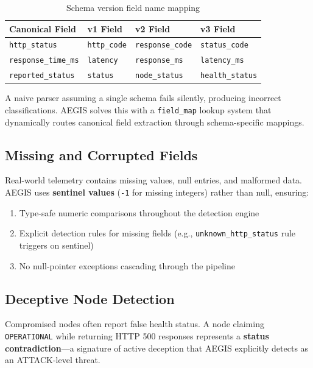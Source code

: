 \documentclass[12pt,a4paper]{article}
\begin{document}
\begin{table}[H]
\centering
\begin{tabularx}{\linewidth}{l l l l}
\toprule
\textbf{Canonical Field} & \textbf{v1 Field} & \textbf{v2 Field} & \textbf{v3 Field} \\
\midrule
\texttt{http\_status} & \texttt{http\_code} & \texttt{response\_code} & \texttt{status\_code} \\
\texttt{response\_time\_ms} & \texttt{latency} & \texttt{response\_ms} & \texttt{latency\_ms} \\
\texttt{reported\_status} & \texttt{status} & \texttt{node\_status} & \texttt{health\_status} \\
\bottomrule
\end{tabularx}
\caption{Schema version field name mapping}
\end{table}

A naive parser assuming a single schema fails silently, producing incorrect classifications. AEGIS solves this with a \texttt{field\_map} lookup system that dynamically routes canonical field extraction through schema-specific mappings.

\subsection{Missing and Corrupted Fields}

Real-world telemetry contains missing values, null entries, and malformed data. AEGIS uses \textbf{sentinel values} (\texttt{-1} for missing integers) rather than null, ensuring:

\begin{enumerate}[noitemsep]
    \item Type-safe numeric comparisons throughout the detection engine
    \item Explicit detection rules for missing fields (e.g., \texttt{unknown\_http\_status} rule triggers on sentinel)
    \item No null-pointer exceptions cascading through the pipeline
\end{enumerate}

\subsection{Deceptive Node Detection}

Compromised nodes often report false health status. A node claiming \texttt{OPERATIONAL} while returning HTTP 500 responses represents a \textbf{status contradiction}---a signature of active deception that AEGIS explicitly detects as an ATTACK-level threat.
\end{document}
